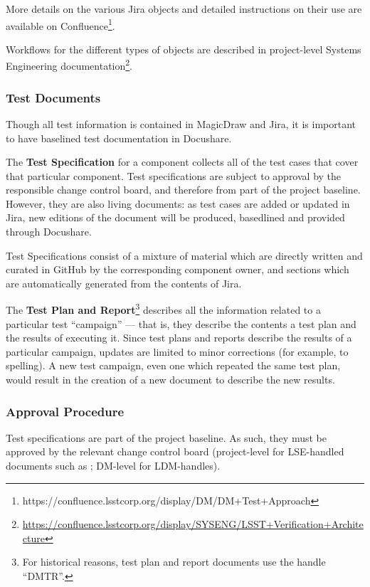 More details on the various Jira objects and detailed instructions on their use are available on Confluence\footnote{https://confluence.lsstcorp.org/display/DM/DM+Test+Approach}.

Workflows for the different types of objects are described in project-level Systems Engineering documentation\footnote{\url{https://confluence.lsstcorp.org/display/SYSENG/LSST+Verification+Architecture}}.

\subsubsection{Test Documents}
\label{sect:testdocs}

Though all test information is contained in MagicDraw and Jira, it is important to have baselined test documentation in Docushare.

The \textbf{Test Specification} for a component collects all of the test cases that cover that particular component.
Test specifications are subject to approval by the responsible change control board, and therefore from part of the project baseline.
However, they are also living documents: as test cases are added or updated in Jira, new editions of the document will be produced, basedlined and provided through Docushare.

Test Specifications consist of a mixture of material which are directly written and curated in GitHub by the corresponding component owner, and sections which are automatically generated from the contents of Jira.

The \textbf{Test Plan and Report}\footnote{For historical reasons, test plan and report documents use the handle ``DMTR''.}  describes all the information related to a particular test ``campaign'' --- that is, they describe the contents a test plan and the results of executing it.
Since test plans and reports describe the results of a particular campaign, updates are limited to minor corrections (for example, to spelling).
A new test campaign, even one which repeated the same test plan, would result in the creation of a new document to describe the new results.

\subsubsection{Approval Procedure}

Test specifications are part of the project baseline.
As such, they must be approved by the relevant change control board (project-level for LSE-handled documents such as ; DM-level for LDM-handles).

